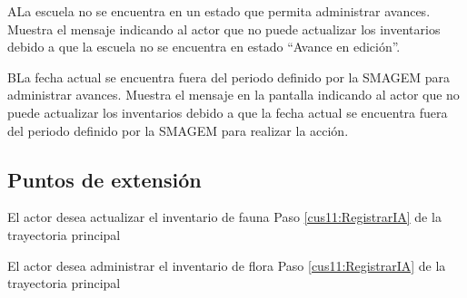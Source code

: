  \begin{UCtrayectoriaA}{A}{La escuela no se encuentra en un estado que permita administrar avances.}
    \UCpaso[\UCsist] Muestra el mensaje  indicando al actor que no puede actualizar los inventarios debido a que la escuela no se encuentra en estado ``Avance en edición''.
 \end{UCtrayectoriaA}

\begin{UCtrayectoriaA}{B}{La fecha actual se encuentra fuera del periodo definido por la SMAGEM para administrar avances.}
    \UCpaso[\UCsist] Muestra el mensaje  en la pantalla  indicando al actor que no puede actualizar los inventarios debido a que la fecha actual se encuentra fuera del periodo definido por la SMAGEM para realizar la acción. 
 \end{UCtrayectoriaA}

\subsection{Puntos de extensión}

\UCExtensionPoint
{El actor desea actualizar el inventario de fauna}
{Paso \ref{cus11:RegistrarIA} de la trayectoria principal}
{}

\UCExtensionPoint
{El actor desea administrar el inventario de flora}
{ Paso \ref{cus11:RegistrarIA} de la trayectoria principal}
{}
